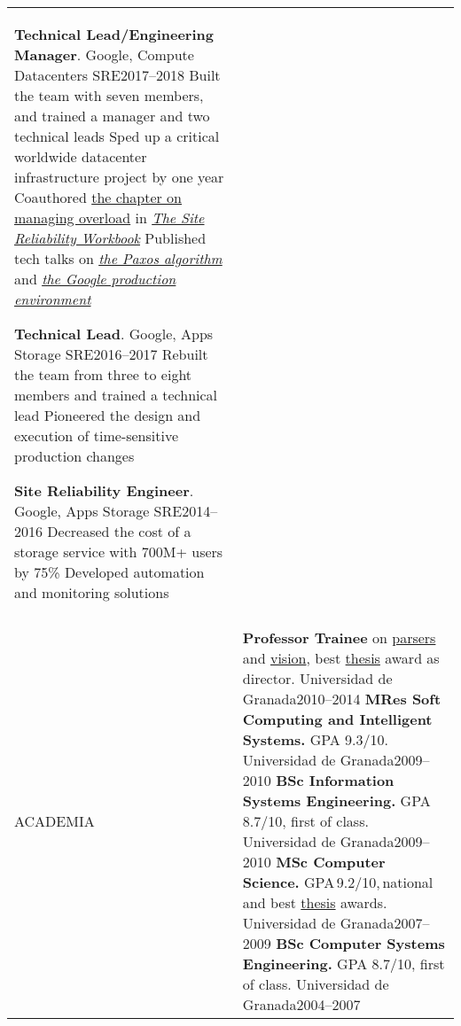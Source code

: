 \documentclass[letterpaper,10pt,oneside]{article}
\newcommand{\DatestampY}[1]{#1}
\newenvironment{body}
{\par\par
\begin{longtable}{p{0.125\textwidth}p{0.84\textwidth}}}
{\par\end{longtable}\par}
\renewcommand{\section}[3]{\\[-0.7cm]\pdfbookmark[2]{#2}{#3}\\%
\raggedleft  %
{\fontsize{9.5pt}{9.5pt}\selectfont\bfseries\raggedright%
\MakeUppercase{#1}}&}
\newcommand{\SmallEntryGap}{\par\vspace{0.38em}\par}
\begin{document}
\begin{body}
\textbf{Technical Lead/Engineering Manager}. Google, Compute Datacenters SRE\hfill \DatestampY{2017}--\DatestampY{2018} \newline
\phantom{w}Built the team with seven members, and trained a manager and two technical leads\newline
\phantom{w}Sped up a critical worldwide datacenter infrastructure project by one year\newline
\phantom{w}Coauthored \href{https://landing.google.com/sre/workbook/chapters/overload/}{the chapter on managing overload} in \textit{\href{https://landing.google.com/sre/books/}{The Site Reliability Workbook}}\newline
\phantom{w}Published tech talks on \textit{\href{https://youtu.be/d7nAGI_NZPk}{the Paxos algorithm}} and \textit{\href{https://youtu.be/dhTVVWzpc4Q}{the Google production environment}}

\SmallEntryGap

\textbf{Technical Lead}. Google, Apps Storage SRE\hfill \DatestampY{2016}--\DatestampY{2017}\newline
\phantom{w}Rebuilt the team from three to eight members and trained a technical lead\newline
\phantom{w}Pioneered the design and execution of time-sensitive production changes

\SmallEntryGap

\textbf{Site Reliability Engineer}. Google, Apps Storage SRE\hfill \DatestampY{2014}--\DatestampY{2016}\newline
\phantom{w}Decreased the cost of a storage service with 700M+ users by 75\%\newline
\phantom{w}Developed automation and monitoring solutions


\section{Academia}{Academia}{PDF:Academia}

\textbf{Professor Trainee} on \href{https://github.com/lquesada/ModelCC}{parsers} and \href{https://github.com/lquesada/MotionTracking}{vision}, best \href{https://github.com/lquesada/ADAgio}{thesis} award as director. Universidad de Granada\hfill \DatestampY{2010}--\DatestampY{2014} \newline
\textbf{MRes Soft Computing and Intelligent Systems.} GPA 9.3/10. Universidad de Granada\hfill \DatestampY{2009}--\DatestampY{2010} \newline
\textbf{BSc Information Systems Engineering.} GPA 8.7/10, first of class. Universidad de Granada\hfill \DatestampY{2009}--\DatestampY{2010} \newline
\textbf{MSc Computer Science.} GPA\,9.2/10,\,national and best \href{https://github.com/lquesada/JSimil}{thesis} awards.\,Universidad de Granada\hfill \DatestampY{2007}--\DatestampY{2009} \newline
\textbf{BSc Computer Systems Engineering.} GPA 8.7/10, first of class. Universidad de Granada\hfill \DatestampY{2004}--\DatestampY{2007}


\end{body}
\end{document}
